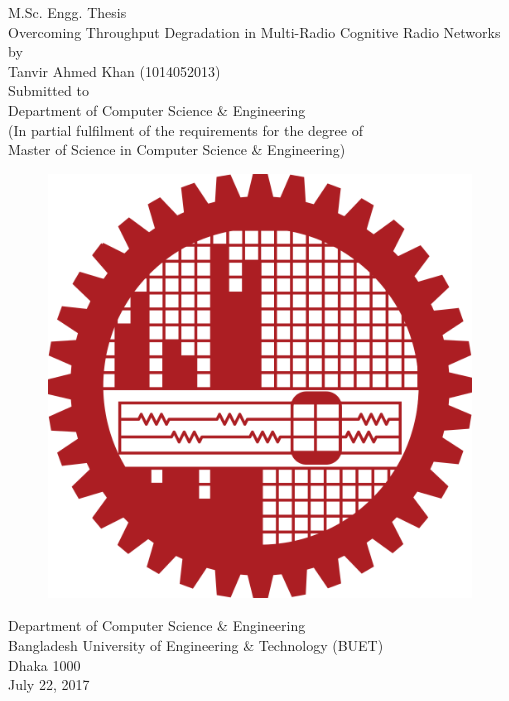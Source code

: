 \begin{titlepage}
\centering 
 {\sc \Large M.Sc. Engg. Thesis} \\
 \vspace{1 cm}
 {\huge \sc Overcoming Throughput Degradation in Multi-Radio Cognitive Radio Networks}\\
 \vspace{0.5 cm}
 {\Large by \\
\sc Tanvir Ahmed Khan} (1014052013) \\
 \vspace{2cm}
 {\Large Submitted to}\\
 {\Large Department of Computer Science \& Engineering\\
 (In partial fulfilment of the requirements for the degree of \\
 Master of Science in Computer Science \& Engineering)} \\
 \vspace{1cm}
 \begin{figure}[h] 
 \centering
 \includegraphics[scale=0.08]{figures/buet_logo}
 \end{figure}
 \vspace{0.3cm}
 {\Large Department of Computer Science \& Engineering\\
 	Bangladesh University of Engineering \& Technology (BUET)\\
 	Dhaka 1000 \\
 }
 \vspace{1cm}
 {July 22, 2017}
\end{titlepage}
